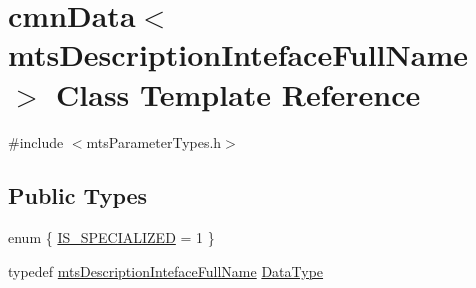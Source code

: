 \hypertarget{classcmn_data_3_01mts_description_inteface_full_name_01_4}{}\section{cmn\+Data$<$ mts\+Description\+Inteface\+Full\+Name $>$ Class Template Reference}
\label{classcmn_data_3_01mts_description_inteface_full_name_01_4}


{\ttfamily \#include $<$mts\+Parameter\+Types.\+h$>$}

\subsection*{Public Types}
\begin{DoxyCompactItemize}
\item 
enum \{ \hyperlink{classcmn_data_3_01mts_description_inteface_full_name_01_4_a50a7f5a7c498087f0c754053433fd413aaea0ce1591d188d502852f254da6c22c}{I\+S\+\_\+\+S\+P\+E\+C\+I\+A\+L\+I\+Z\+E\+D} = 1
 \}
\item 
typedef \hyperlink{classmts_description_inteface_full_name}{mts\+Description\+Inteface\+Full\+Name} \hyperlink{classcmn_data_3_01mts_description_inteface_full_name_01_4_a7c49303638b183151217d48ca5d2eda8}{Data\+Type}
\end{DoxyCompactItemize}
